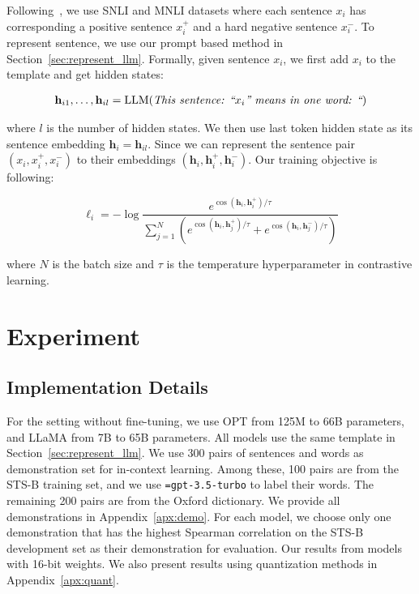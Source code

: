 \documentclass{article}
\newcommand{\hytt}[1]{\texttt{\hyphenchar \font=\defaulthyphenchar#1}}
\begin{document}
Following~\cite{gao2021simcse}, we use SNLI and MNLI datasets where each sentence $x_i$ has corresponding a positive sentence $x_i^{+}$ and a hard negative sentence $x_i^{-}$. To represent sentence, we use our prompt based method in Section~\ref{sec:represent_llm}.
Formally, given sentence $x_i$, we first add $x_i$ to the template and get hidden states:

\begin{equation}
\begin{split}
  \mathbf{h}_{i1}, \ldots, \mathbf{h}_{il} = {\rm LLM}(\textit{This  sen}&\textit{tence: ``} x_i \textit{'' means in one word: ``})\\
\end{split}
\end{equation}

where $l$ is the number of hidden states. We then use last token hidden state as its sentence embedding $\mathbf{h}_{i} = \mathbf{h}_{il}$.
Since we can represent the sentence pair $(x_i, x_i^{+}, x_i^{-})$ to their embeddings $(\mathbf{h}_i, \mathbf{h}_i^{+}, \mathbf{h}_i^{-})$.
Our training objective is following:

\begin{equation}
\ell_{i}=-\log \frac{e^{\operatorname{cos}\left(\mathbf{h}_i, \mathbf{h}_i^{+}\right) / \tau}}{\sum_{j=1}^N\left(e^{\operatorname{cos}\left(\mathbf{h}_i, \mathbf{h}_j^{+}\right) / \tau}+e^{\operatorname{cos}\left(\mathbf{h}_i, \mathbf{h}_j^{-}\right) / \tau}\right)}
\end{equation}

where $N$ is the batch size and \(\tau\) is the temperature hyperparameter in contrastive learning.


\section{Experiment}
\subsection{Implementation Details}
For the setting without fine-tuning, we use OPT from 125M to 66B parameters, and LLaMA from 7B to 65B parameters.
All models use the same template in Section~\ref{sec:represent_llm}.
 We use 300 pairs of sentences and words as demonstration set for in-context learning. Among these, 100 pairs are from the STS-B training set, and we use \hytt{gpt-3.5-turbo} to label their words. The remaining 200 pairs are from the Oxford dictionary. We provide all demonstrations in Appendix~\ref{apx:demo}.
For each model, we choose only one demonstration that has the highest Spearman correlation on the STS-B development set as their demonstration for evaluation.
Our results from models with 16-bit weights. We also present results using quantization methods in Appendix~\ref{apx:quant}.
\end{document}
